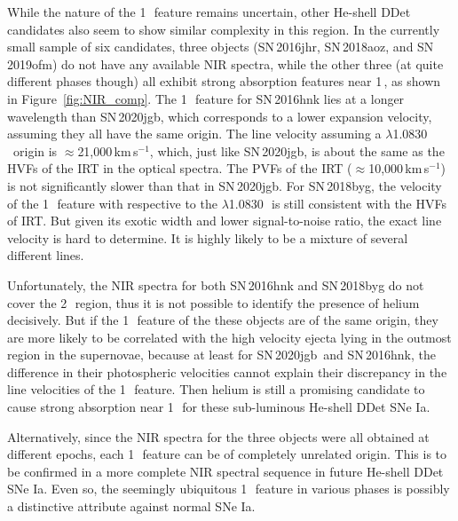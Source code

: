 \documentclass[twocolumn]{aastex631}
\newcommand{\sn}{SN\,2020jgb}
\begin{document}
While the nature of the 1\,\micron\ feature remains uncertain, other He-shell DDet candidates also seem to show similar complexity in this region. In the currently small sample of six candidates, three objects (SN\,2016jhr, SN\,2018aoz, and SN\,2019ofm) do not have any available NIR spectra, while the other three (at quite different phases though) all exhibit strong absorption features near 1\,\micron, as shown in Figure~\ref{fig:NIR_comp}. The 1\,\micron\ feature for SN\,2016hnk lies at a longer wavelength than \sn, which corresponds to a lower expansion velocity, assuming they all have the same origin. The line velocity assuming a  $\lambda$1.0830\,\micron\ origin is $\approx$21,000\,km\,s$^{-1}$, which, just like \sn, is about the same as the HVFs of the  IRT in the optical spectra. The PVFs of the  IRT ($\approx$10,000\,km\,s$^{-1}$) is not significantly slower than that in \sn. For SN\,2018byg, the velocity of the 1\,\micron\ feature with respective to the  $\lambda$1.0830\,\micron\ is still consistent with the HVFs of  IRT. But given its exotic width and lower signal-to-noise ratio, the exact line velocity is hard to determine. It is highly likely to be a mixture of several different lines. 

Unfortunately, the NIR spectra for both SN\,2016hnk and SN\,2018byg do not cover the 2\,\micron\ region, thus it is not possible to identify the presence of helium decisively. But if the 1\,\micron\ feature of the these objects are of the same origin, they are more likely to be correlated with the high velocity ejecta lying in the outmost region in the supernovae, because at least for \sn\ and SN\,2016hnk, the difference in their photospheric velocities cannot explain their discrepancy in the line velocities of the 1\,\micron\ feature. Then helium is still a promising candidate to cause strong absorption near 1\,\micron\ for these sub-luminous He-shell DDet SNe Ia. 

Alternatively, since the NIR spectra for the three objects were all obtained at different epochs, each 1\,\micron\ feature can be of completely unrelated origin. This is to be confirmed in a more complete NIR spectral sequence in future He-shell DDet SNe Ia. Even so, the seemingly ubiquitous 1\,\micron\ feature in various phases is possibly a distinctive attribute against normal SNe Ia.
\end{document}
